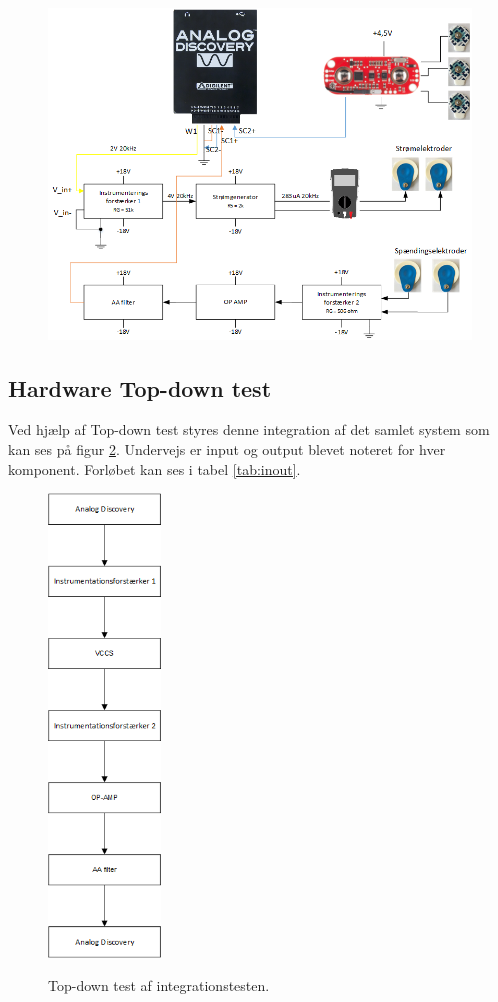 \begin{figure}[H] 
\centering
{\includegraphics[width=\linewidth]
{Figure/integrationstestDiagram}}
\caption{}
\label{fig:integrationstestDiagram}
\end{figure}


\subsection{Hardware Top-down test}

Ved hjælp af Top-down test styres denne integration af det samlet system som kan ses på figur \ref{fig:integrationstestTopdowntest}. Undervejs er input og output blevet noteret for hver komponent. Forløbet kan ses i tabel \ref{tab:inout}. 

\begin{figure}[H] 
\centering
{\includegraphics[width=3cm]
{Figure/integrationstestTopdowntest}}
\caption{Top-down test af integrationstesten.}
\label{fig:integrationstestTopdowntest}
\end{figure}

